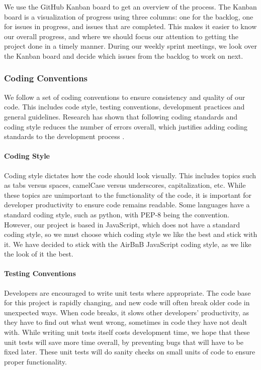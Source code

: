 We use the GitHub Kanban board to get an overview of the process. The Kanban board is a
visualization of progress using three columns: one for the backlog, one for issues in
progress, and issues that are completed. This makes it easier to know our overall
progress, and where we should focus our attention to getting the project done in a timely
manner. During our weekly sprint meetings, we look over the Kanban board and decide which
issues from the backlog to work on next.

\subsubsection{Coding Conventions}

We follow a set of coding conventions to ensure consistency and quality of our code. This
includes code style, testing conventions, development practices and general guidelines.
Research has shown that following coding standards and coding style reduces the number of
errors overall, which justifies adding coding standards to the development process
\autocite{codingstyle}.

\paragraph{Coding Style}

Coding style dictates how the code should look visually. This includes topics such as tabs
versus spaces, camelCase versus underscores, capitalization, etc. While these topics are
unimportant to the functionality of the code, it is important for developer productivity
to ensure code remains readable. Some languages have a standard coding style, such as
python, with PEP-8 being the convention. However, our project is based in JavaScript,
which does not have a standard coding style, so we must choose which coding style we like
the best and stick with it. We have decided to stick with the AirBnB JavaScript coding
style, as we like the look of it the best.

\paragraph{Testing Conventions}

Developers are encouraged to write unit tests where appropriate. The code base for this
project is rapidly changing, and new code will often break older code in unexpected ways.
When code breaks, it slows other developers' productivity, as they have to find out what
went wrong, sometimes in code they have not dealt with. While writing unit tests itself
costs development time, we hope that these unit tests will save more time overall, by
preventing bugs that will have to be fixed later.  These unit tests will do sanity checks
on small units of code to ensure proper functionality.

